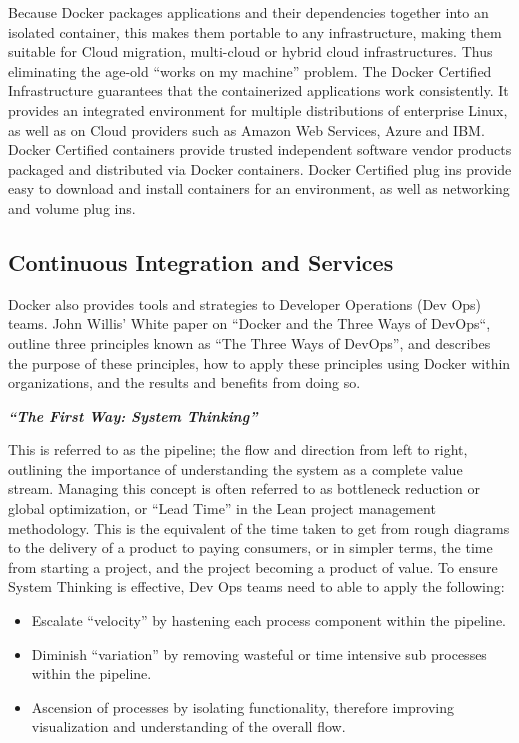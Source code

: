 Because Docker packages applications and their dependencies together into an isolated container, this makes them portable to any infrastructure, making them suitable for Cloud migration, multi-cloud or hybrid cloud infrastructures. Thus eliminating the age-old “works on my machine” problem. The Docker Certified Infrastructure guarantees that the containerized applications work consistently. It provides an integrated environment for multiple distributions of enterprise Linux, as well as on Cloud providers such as Amazon Web Services, Azure and IBM. Docker Certified containers provide trusted independent software vendor products packaged and distributed via Docker containers. Docker Certified plug ins provide easy to download and install containers for an environment, as well as networking and volume plug ins.

\subsection{Continuous Integration and Services}
Docker also provides tools and strategies to Developer Operations (Dev Ops) teams. John Willis’ White paper on “Docker and the Three Ways of DevOps“, outline three principles known as “The Three Ways of DevOps”, and describes the purpose of these principles, how to apply these principles using Docker within organizations, and the results and benefits from doing so. 

\textbf{\emph{“The First Way: System Thinking”}}

This is referred to as the pipeline; the flow and direction from left to right, outlining the importance of understanding the system as a complete value stream. Managing this concept is often referred to as bottleneck reduction or global optimization, or “Lead Time” in the Lean project management methodology\cite{willis}. This is the equivalent of the time taken to get from rough diagrams to the delivery of a product to paying consumers, or in simpler terms, the time from starting a project, and the project becoming a product of value\cite{willis}.  To ensure System Thinking is effective, Dev Ops teams need to able to apply the following:

\begin{itemize}
\item Escalate “velocity” by hastening each process component within the pipeline.
\item Diminish “variation” by removing wasteful or time intensive sub processes within the pipeline.
\item Ascension of processes by isolating functionality, therefore improving visualization and understanding of the overall flow.
\end{itemize}

